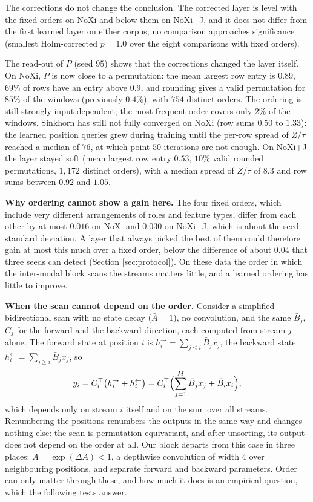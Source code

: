 \documentclass[10pt,a4paper,twocolumn]{article}
\begin{document}
	The corrections do not change the conclusion. The corrected layer is level with the fixed orders on NoXi and below them on NoXi+J, and it does not differ from the first learned layer on either corpus; no comparison approaches significance (smallest Holm-corrected $p = 1.0$ over the eight comparisons with fixed orders).

	The read-out of $P$ (seed $95$) shows that the corrections changed the layer itself. On NoXi, $P$ is now close to a permutation: the mean largest row entry is $0.89$, $69\%$ of rows have an entry above $0.9$, and rounding gives a valid permutation for $85\%$ of the windows (previously $0.4\%$), with $754$ distinct orders. The ordering is still strongly input-dependent; the most frequent order covers only $2\%$ of the windows. Sinkhorn has still not fully converged on NoXi (row sums $0.50$ to $1.33$): the learned position queries grew during training until the per-row spread of $Z/\tau$ reached a median of $76$, at which point $50$ iterations are not enough. On NoXi+J the layer stayed soft (mean largest row entry $0.53$, $10\%$ valid rounded permutations, $1{,}172$ distinct orders), with a median spread of $Z/\tau$ of $8.3$ and row sums between $0.92$ and $1.05$.

	\textbf{Why ordering cannot show a gain here.} The four fixed orders, which include very different arrangements of roles and feature types, differ from each other by at most $0.016$ on NoXi and $0.030$ on NoXi+J, which is about the seed standard deviation. A layer that always picked the best of them could therefore gain at most this much over a fixed order, below the difference of about $0.04$ that three seeds can detect (Section \ref{sec:protocol}). On these data the order in which the inter-modal block scans the streams matters little, and a learned ordering has little to improve.

	\textbf{When the scan cannot depend on the order.} Consider a simplified bidirectional scan with no state decay ($\bar{A} = 1$), no convolution, and the same $\bar{B}_j$, $C_j$ for the forward and the backward direction, each computed from stream $j$ alone. The forward state at position $i$ is $h_i^{\rightarrow} = \sum_{j \le i} \bar{B}_j x_j$, the backward state $h_i^{\leftarrow} = \sum_{j \ge i} \bar{B}_j x_j$, so
	$$y_i = C_i^\top\bigl(h_i^{\rightarrow} + h_i^{\leftarrow}\bigr) = C_i^\top\Bigl(\sum_{j=1}^{M} \bar{B}_j x_j + \bar{B}_i x_i\Bigr),$$
	which depends only on stream $i$ itself and on the sum over all streams. Renumbering the positions renumbers the outputs in the same way and changes nothing else: the scan is permutation-equivariant, and after unsorting, its output does not depend on the order at all. Our block departs from this case in three places: $\bar{A} = \exp(\Delta A) < 1$, a depthwise convolution of width $4$ over neighbouring positions, and separate forward and backward parameters. Order can only matter through these, and how much it does is an empirical question, which the following tests answer.
\end{document}
